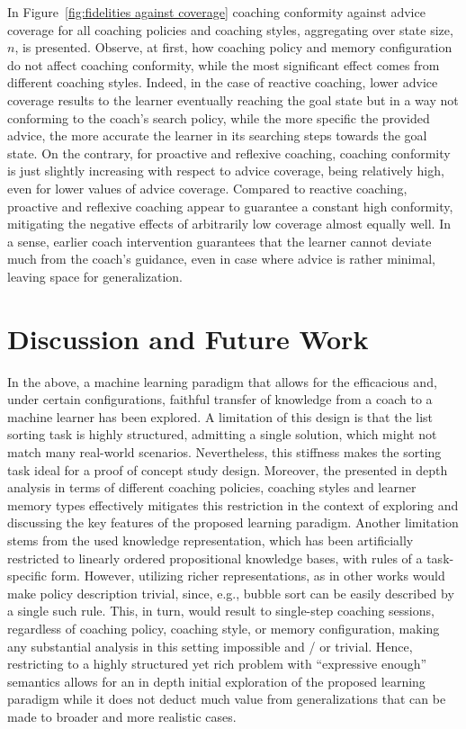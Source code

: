 \documentclass[a4paper,twoside]{article}
\begin{document}
In Figure~\ref{fig:fidelities against coverage} coaching conformity against advice coverage for all coaching policies and coaching styles, aggregating over state size, $n$, is presented. Observe, at first, how coaching policy and memory configuration do not affect coaching conformity, while the most significant effect comes from different coaching styles. Indeed, in the case of reactive coaching, lower advice coverage results to the learner eventually reaching the goal state but in a way not conforming to the coach's search policy, while the more specific the provided advice, the more accurate the learner in its searching steps towards the goal state. On the contrary, for proactive and reflexive coaching, coaching conformity is just slightly increasing with respect to advice coverage, being relatively high, even for lower values of advice coverage. Compared to reactive coaching, proactive and reflexive coaching appear to guarantee a constant high conformity, mitigating the negative effects of arbitrarily low coverage almost equally well. In a sense, earlier coach intervention guarantees that the learner cannot deviate much from the coach's guidance, even in case where advice is rather minimal, leaving space for generalization.
%
%
%
\section{Discussion and Future Work}\label{sec:discussion-and-future-work}
%
In the above, a machine learning paradigm that allows for the efficacious and, under certain configurations, faithful transfer of knowledge from a coach to a machine learner has been explored. A limitation of this design is that the list sorting task is highly structured, admitting a single solution, which might not match many real-world scenarios. Nevertheless, this stiffness makes the sorting task ideal for a proof of concept study design. Moreover, the presented in depth analysis in terms of different coaching policies, coaching styles and learner memory types effectively mitigates this restriction in the context of exploring and discussing the key features of the proposed learning paradigm. Another limitation stems from the used knowledge representation, which has been artificially restricted to linearly ordered propositional knowledge bases, with rules of a task-specific form. However, utilizing richer representations, as in other works \cite{michaelMachineCoaching2019,prudens2022,ioannouKnowledgeBasedTranslationNatural2021} would make policy description trivial, since, e.g., bubble sort can be easily described by a single such rule. This, in turn, would result to single-step coaching sessions, regardless of coaching policy, coaching style, or memory configuration, making any substantial analysis in this setting impossible and / or trivial. Hence, restricting to a highly structured yet rich problem with ``expressive enough'' semantics allows for an in depth initial exploration of the proposed learning paradigm while it does not deduct much value from generalizations that can be made to broader and more realistic cases.
\end{document}
